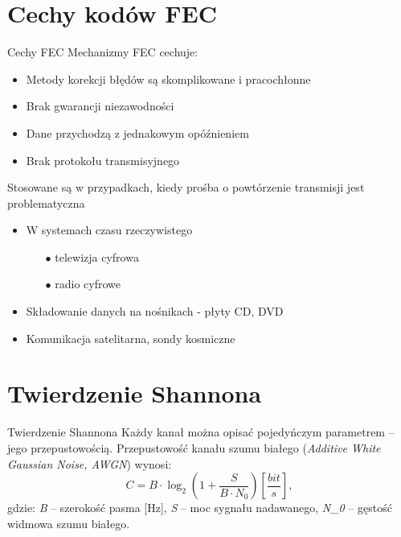 \documentclass[12pt]{beamer}
\begin{document}
\section{Cechy kodów FEC}
\begin{frame}{Cechy FEC}
Mechanizmy FEC cechuje:
\begin{itemize}
	\item Metody korekcji błędów są skomplikowane i pracochłonne
	\item Brak gwarancji niezawodności
	\item Dane przychodzą z jednakowym opóźnieniem
	\item Brak protokołu transmisyjnego
\end{itemize}
Stosowane są w przypadkach, kiedy prośba o powtórzenie transmisji jest problematyczna
\begin{itemize}
	\item W systemach czasu rzeczywistego
	\begin{itemize}
		\item[$\bullet$] telewizja cyfrowa
		\item[$\bullet$] radio cyfrowe		
	\end{itemize}
	\item Składowanie danych na nośnikach - płyty CD, DVD
	\item Komunikacja satelitarna, sondy kosmiczne
\end{itemize}
\end{frame}

\section{Twierdzenie Shannona}
\begin{frame}{Twierdzenie Shannona}
Każdy kanał można opisać pojedyńczym parametrem -- jego przepustowością.
Przepustowość kanału szumu białego (\emph{Additive White Gaussian Noise, AWGN}) wynosi:
\begin{equation}
C=B\cdot\log_2(1+\frac{S}{B \cdot N_0}) [\frac{bit}{s}],
\end{equation}
gdzie: \emph{B} -- szerokość pasma [Hz], \emph{S} -- moc sygnału nadawanego,
\emph{N_0} 
-- gęstość 
widmowa szumu 
białego.
\end{frame}
\end{document}

